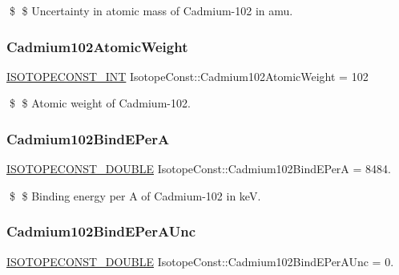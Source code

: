 \$ \$ Uncertainty in atomic mass of Cadmium-\/102 in amu. \mbox{\label{group___isotope_const-_cadmium-_cd102_gaca90a50c837a783a026798d5537aab2c}} 
\subsubsection{\texorpdfstring{Cadmium102\+Atomic\+Weight}{Cadmium102AtomicWeight}}
{\footnotesize\ttfamily \mbox{\hyperlink{group___isotope_const-_macros_ga5f18360b3e99483a35c32d789e62621c}{I\+S\+O\+T\+O\+P\+E\+C\+O\+N\+S\+T\+\_\+\+I\+NT}} Isotope\+Const\+::\+Cadmium102\+Atomic\+Weight = 102}

\$ \$ Atomic weight of Cadmium-\/102. \mbox{\label{group___isotope_const-_cadmium-_cd102_gacb368b4004a78bbb100c35d3b33e02ad}} 
\subsubsection{\texorpdfstring{Cadmium102\+Bind\+E\+PerA}{Cadmium102BindEPerA}}
{\footnotesize\ttfamily \mbox{\hyperlink{group___isotope_const-_macros_ga8f45a7272ce02c0b4c65c44636ed719a}{I\+S\+O\+T\+O\+P\+E\+C\+O\+N\+S\+T\+\_\+\+D\+O\+U\+B\+LE}} Isotope\+Const\+::\+Cadmium102\+Bind\+E\+PerA = 8484.}

\$ \$ Binding energy per A of Cadmium-\/102 in keV. \mbox{\label{group___isotope_const-_cadmium-_cd102_gaa846fe92e7258bc11f6559a62783eb55}} 
\subsubsection{\texorpdfstring{Cadmium102\+Bind\+E\+Per\+A\+Unc}{Cadmium102BindEPerAUnc}}
{\footnotesize\ttfamily \mbox{\hyperlink{group___isotope_const-_macros_ga8f45a7272ce02c0b4c65c44636ed719a}{I\+S\+O\+T\+O\+P\+E\+C\+O\+N\+S\+T\+\_\+\+D\+O\+U\+B\+LE}} Isotope\+Const\+::\+Cadmium102\+Bind\+E\+Per\+A\+Unc = 0.}

